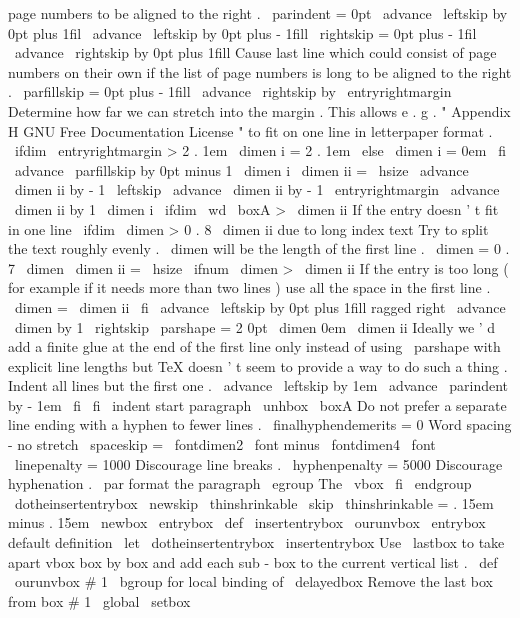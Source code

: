 {{{{{page
numbers
to
be
aligned
to
the
right
.
%
\
parindent
=
0pt
\
advance
\
leftskip
by
0pt
plus
1fil
\
advance
\
leftskip
by
0pt
plus
-
1fill
\
rightskip
=
0pt
plus
-
1fil
\
advance
\
rightskip
by
0pt
plus
1fill
%
Cause
last
line
which
could
consist
of
page
numbers
on
their
own
%
if
the
list
of
page
numbers
is
long
to
be
aligned
to
the
right
.
\
parfillskip
=
0pt
plus
-
1fill
%
\
advance
\
rightskip
by
\
entryrightmargin
%
Determine
how
far
we
can
stretch
into
the
margin
.
%
This
allows
e
.
g
.
"
Appendix
H
GNU
Free
Documentation
License
"
to
%
fit
on
one
line
in
letterpaper
format
.
\
ifdim
\
entryrightmargin
>
2
.
1em
\
dimen
i
=
2
.
1em
\
else
\
dimen
i
=
0em
\
fi
\
advance
\
parfillskip
by
0pt
minus
1
\
dimen
i
%
\
dimen
ii
=
\
hsize
\
advance
\
dimen
ii
by
-
1
\
leftskip
\
advance
\
dimen
ii
by
-
1
\
entryrightmargin
\
advance
\
dimen
ii
by
1
\
dimen
i
\
ifdim
\
wd
\
boxA
>
\
dimen
ii
%
If
the
entry
doesn
'
t
fit
in
one
line
\
ifdim
\
dimen
>
0
.
8
\
dimen
ii
%
due
to
long
index
text
%
Try
to
split
the
text
roughly
evenly
.
\
dimen
will
be
the
length
of
%
the
first
line
.
\
dimen
=
0
.
7
\
dimen
\
dimen
ii
=
\
hsize
\
ifnum
\
dimen
>
\
dimen
ii
%
If
the
entry
is
too
long
(
for
example
if
it
needs
more
than
%
two
lines
)
use
all
the
space
in
the
first
line
.
\
dimen
=
\
dimen
ii
\
fi
\
advance
\
leftskip
by
0pt
plus
1fill
%
ragged
right
\
advance
\
dimen
by
1
\
rightskip
\
parshape
=
2
0pt
\
dimen
0em
\
dimen
ii
%
Ideally
we
'
d
add
a
finite
glue
at
the
end
of
the
first
line
only
%
instead
of
using
\
parshape
with
explicit
line
lengths
but
TeX
%
doesn
'
t
seem
to
provide
a
way
to
do
such
a
thing
.
%
%
Indent
all
lines
but
the
first
one
.
\
advance
\
leftskip
by
1em
\
advance
\
parindent
by
-
1em
\
fi
\
fi
\
indent
%
start
paragraph
\
unhbox
\
boxA
%
%
Do
not
prefer
a
separate
line
ending
with
a
hyphen
to
fewer
lines
.
\
finalhyphendemerits
=
0
%
%
Word
spacing
-
no
stretch
\
spaceskip
=
\
fontdimen2
\
font
minus
\
fontdimen4
\
font
%
\
linepenalty
=
1000
%
Discourage
line
breaks
.
\
hyphenpenalty
=
5000
%
Discourage
hyphenation
.
%
\
par
%
format
the
paragraph
\
egroup
%
The
\
vbox
\
fi
\
endgroup
\
dotheinsertentrybox
}
}
\
newskip
\
thinshrinkable
\
skip
\
thinshrinkable
=
.
15em
minus
.
15em
\
newbox
\
entrybox
\
def
\
insertentrybox
{
%
\
ourunvbox
\
entrybox
}
%
default
definition
\
let
\
dotheinsertentrybox
\
insertentrybox
%
Use
\
lastbox
to
take
apart
vbox
box
by
box
and
add
each
sub
-
box
%
to
the
current
vertical
list
.
\
def
\
ourunvbox
#
1
{
%
\
bgroup
%
for
local
binding
of
\
delayedbox
%
Remove
the
last
box
from
box
#
1
\
global
\
setbox
}}}}
